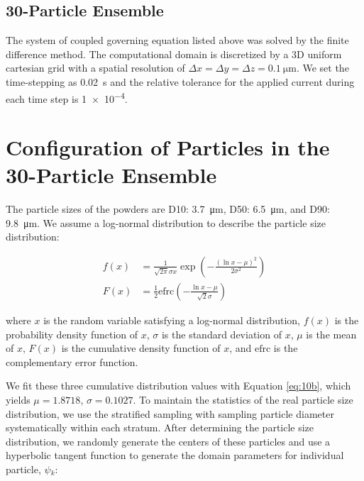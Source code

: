 \documentclass{article}
\begin{document}
\subsection{30-Particle Ensemble}

The system of coupled governing equation listed above was solved by
the finite difference method. The computational domain is discretized
by a 3D uniform cartesian grid with a spatial resolution of $\Delta
x=\Delta y=\Delta z= \SI{0.1}{\micro\meter}$. We set the time-stepping
as \SI{0.02}{\second} and the relative tolerance for the applied
current during each time step is \num{1e-4}.


\section{Configuration of Particles in the 30-Particle Ensemble}

The particle sizes of the \nca{} powders are D10:
\SI{3.7}{\micro\meter}, D50: \SI{6.5}{\micro\meter}, and D90:
\SI{9.8}{\micro\meter}. We assume a log-normal distribution to
describe the particle size distribution:

\begin{subequations}
\begin{align}
  f(x) & = \frac {1}{\sqrt{2\pi}\sigma x} \exp \left(-\frac{(\ln{x}-\mu )^2}{2\sigma^2}\right)
  \label{eq:10a} \\
  F(x) &= \frac{1}{2} \mathrm{efrc}\left(-\frac{\ln{x}-\mu }{\sqrt{2}\sigma}\right)
  \label{eq:10b}
\end{align}
\end{subequations}

where $x$ is the random variable satisfying a log-normal distribution,
$f(x)$ is the probability density function of $x$, $\sigma$ is the
standard deviation of $x$, $\mu$ is the mean of $x$, $F(x)$ is the
cumulative density function of $x$, and $\mathrm{efrc}$ is the
complementary error function.

We fit these three cumulative distribution values with Equation
\ref{eq:10b}, which yields $\mu =1.8718$, $\sigma=0.1027$. To maintain
the statistics of the real particle size distribution, we use the
stratified sampling\cite{parsons2017} with sampling particle diameter
systematically within each stratum. After determining the particle
size distribution, we randomly generate the centers of these particles
and use a hyperbolic tangent function to generate the domain
parameters for individual particle, $\psi{}_k$:
\end{document}
